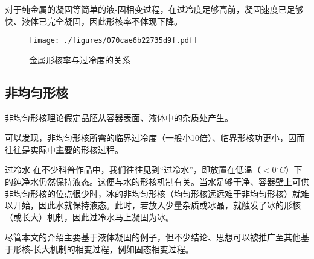 对于纯金属的凝固等简单的液-固相变过程，在过冷度足够高前，凝固速度已足够快、液体已完全凝固，因此形核率不体现下降。
\begin{figure}[ht]
\centering
\texttt{[image: ./figures/070cae6b22735d9f.pdf]}
\caption{金属形核率与过冷度的关系} \label{fig_NCLT_8}
\end{figure}

\subsection{非均匀形核}
非均匀形核理论假定晶胚从容器表面、液体中的杂质处产生。

可以发现，非均匀形核所需的临界过冷度（一般小10倍）、临界形核功更小，因而往往是实际中\textbf{主要}的形核过程。

\begin{example}{过冷水}
在不少科普作品中，我们往往见到“过冷水”，即放置在低温（$<0 ^\circ C$）下的纯净水仍然保持液态。这便与水的形核机制有关。当水足够干净、容器壁上可供非均匀形核的位点很少时，冰的非均匀形核（均匀形核远远难于非均匀形核）就难以开始，因此水就保持液态。此时，若放入少量杂质或冰晶，就触发了冰的形核（或长大）机制，因此过冷水马上凝固为冰。
\end{example}

尽管本文的介绍主要基于液体凝固的例子，但不少结论、思想可以被推广至其他基于形核-长大机制的相变过程，例如固态相变过程。
